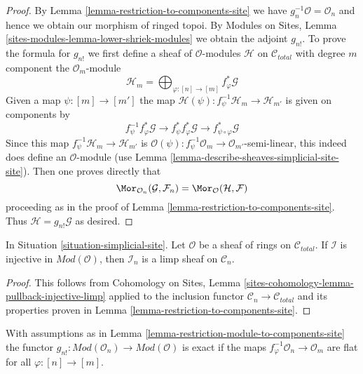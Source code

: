 \begin{proof}
By Lemma \ref{lemma-restriction-to-components-site} we have
$g_n^{-1}\mathcal{O} = \mathcal{O}_n$ and hence we obtain our
morphism of ringed topoi. By Modules on Sites, Lemma
\ref{sites-modules-lemma-lower-shriek-modules}
we obtain the adjoint $g_{n!}$. To prove the formula for $g_{n!}$
we first define a sheaf of $\mathcal{O}$-modules $\mathcal{H}$
on $\mathcal{C}_{total}$ with degree $m$ component
the $\mathcal{O}_m$-module
$$
\mathcal{H}_m =
\bigoplus\nolimits_{\varphi : [n] \to [m]} f_\varphi^*\mathcal{G}
$$
Given a map $\psi : [m] \to [m']$ the map
$\mathcal{H}(\psi) : f_\psi^{-1}\mathcal{H}_m \to \mathcal{H}_{m'}$
is given on components by
$$
f_\psi^{-1} f_\varphi^*\mathcal{G} \to
f_\psi^* f_\varphi^*\mathcal{G} \to
f_{\psi \circ \varphi}^*\mathcal{G}
$$
Since this map $f_\psi^{-1}\mathcal{H}_m \to \mathcal{H}_{m'}$ is
$\mathcal{O}(\psi) : f_\psi^{-1}\mathcal{O}_m \to \mathcal{O}_{m'}$-semi-linear,
this indeed does define an $\mathcal{O}$-module
(use Lemma \ref{lemma-describe-sheaves-simplicial-site-site}).
Then one proves directly that
$$
\Mor_{\mathcal{O}_n}(\mathcal{G}, \mathcal{F}_n) =
\Mor_{\mathcal{O}}(\mathcal{H}, \mathcal{F})
$$
proceeding as in the proof of Lemma \ref{lemma-restriction-to-components-site}.
Thus $\mathcal{H} = g_{n!}\mathcal{G}$ as desired.
\end{proof}

\begin{lemma}
\label{lemma-restriction-injective-to-component-limp}
In Situation \ref{situation-simplicial-site}.
Let $\mathcal{O}$ be a sheaf of rings on $\mathcal{C}_{total}$.
If $\mathcal{I}$ is injective in $\textit{Mod}(\mathcal{O})$, then
$\mathcal{I}_n$ is a limp sheaf on $\mathcal{C}_n$.
\end{lemma}

\begin{proof}
This follows from
Cohomology on Sites, Lemma \ref{sites-cohomology-lemma-pullback-injective-limp}
applied to the inclusion functor $\mathcal{C}_n \to \mathcal{C}_{total}$
and its properties proven in Lemma \ref{lemma-restriction-to-components-site}.
\end{proof}

\begin{lemma}
\label{lemma-exactness-g-shriek-modules}
With assumptions as in
Lemma \ref{lemma-restriction-module-to-components-site} the functor
$g_{n!} : \textit{Mod}(\mathcal{O}_n) \to \textit{Mod}(\mathcal{O})$
is exact if the maps $f_\varphi^{-1}\mathcal{O}_n \to \mathcal{O}_m$
are flat for all $\varphi : [n] \to [m]$.
\end{lemma}

